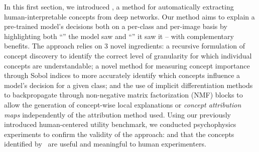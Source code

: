 In this first section, we introduced \craft, a method for automatically extracting human-interpretable concepts from deep networks. Our method aims to explain a pre-trained model's decisions both on a per-class and per-image basis by highlighting both ``\what'' the model saw and ``\where'' it saw it  -- with complementary benefits. The approach relies on 3 novel ingredients:  a recursive formulation of concept discovery to identify the correct level of granularity for which individual concepts are understandable;  a novel method for measuring concept importance through Sobol indices to more accurately identify which concepts influence a model's decision for a given class; and  the use of implicit differentiation methods to backpropagate through non-negative matrix factorization (NMF) blocks to allow the generation of concept-wise local explanations or \textit{concept attribution maps} independently of the attribution method used. Using our previously introduced human-centered utility benchmark, we conducted psychophysics experiments to confirm the validity of the approach: and that the concepts identified by \craft~are useful and meaningful to human experimenters. 

